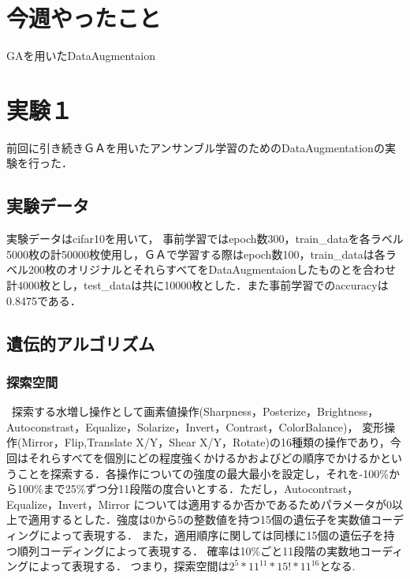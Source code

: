 \documentclass[twocolumn]{jarticle}     %
\begin{document}

\section{今週やったこと}
 GAを用いたDataAugmentaion

\section{実験１}
前回に引き続きＧＡを用いたアンサンブル学習のためのDataAugmentationの実験を行った．\\

\subsection{実験データ}
実験データはcifar10を用いて，
事前学習ではepoch数300，train\_dataを各ラベル5000枚の計50000枚使用し，ＧＡで学習する際はepoch数100，train\_dataは各ラベル200枚のオリジナルとそれらすべてをDataAugmentaionしたものとを合わせ計4000枚とし，test\_dataは共に10000枚とした．また事前学習でのaccuracyは0.8475である．
\subsection{遺伝的アルゴリズム}


\subsubsection{探索空間}
\ 探索する水増し操作として画素値操作(Sharpness，Posterize，Brightness，Autoconstrast，Equalize，Solarize，Invert，Contrast，ColorBalance)，
変形操作(Mirror，Flip,Translate X/Y，Shear X/Y，Rotate)の16種類の操作であり，今回はそれらすべてを個別にどの程度強くかけるかおよびどの順序でかけるかということを探索する．各操作についての強度の最大最小を設定し，それを-100\%から100\%まで25\%ずつ分11段階の度合いとする．ただし，Autocontrast，Equalize，Invert，Mirror については適用するか否かであるためパラメータが0以上で適用するとした．強度は0から5の整数値を持つ15個の遺伝子を実数値コーディングによって表現する．
また，適用順序に関しては同様に15個の遺伝子を持つ順列コーディングによって表現する．
確率は10\%ごと11段階の実数地コーディングによって表現する．
つまり，探索空間は$2^5*11^{11}*15!*11^{16}$となる.
\end{document}
